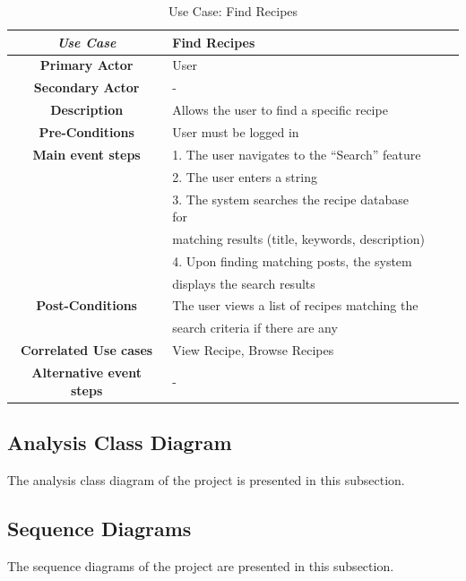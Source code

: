 \begin{table}[ht!]
    \centering
    \caption{Use Case: Find Recipes}
    \begin{tabular}{|Sl|Sl|}
        \hline
        \textbf{\textit{Use Case}}      & \textbf{Find Recipes}                                     \\ \hline
        \textbf{Primary Actor}           & User                                            \\ \hline
        \textbf{Secondary Actor}         & -                                               \\ \hline
        \textbf{Description}             & Allows the user to find a specific recipe       \\ \hline
        \textbf{Pre-Conditions}          & User must be logged in                          \\ \hline
        \textbf{Main event steps}        & 1. The user navigates to the “Search” feature   \\ 
                                          & 2. The user enters a string                     \\
                                          & 3. The system searches the recipe database for  \\ 
                                          & matching results (title, keywords, description) \\ 
                                          & 4. Upon finding matching posts, the system      \\ 
                                          & displays the search results                     \\ \hline
        \textbf{Post-Conditions}         & The user views a list of recipes matching the   \\ 
                                          & search criteria if there are any                \\ \hline
        \textbf{Correlated Use cases}    & View Recipe, Browse Recipes                     \\ \hline
        \textbf{Alternative event steps} & -                                               \\ \hline
    \end{tabular}
\end{table}
\subsection{Analysis Class Diagram}

The analysis class diagram of the project is presented in this subsection.

\subsection{Sequence Diagrams}

The sequence diagrams of the project are presented in this subsection.

